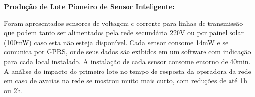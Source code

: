
\textbf{Produção de Lote Pioneiro de Sensor Inteligente:}

Foram apresentados sensores de voltagem e corrente para linhas de transmissão
que podem tanto ser alimentados pela rede secundária 220V ou por painel solar
(100mW) caso esta não esteja disponível. Cada sensor consome 14mW e se comunica
por GPRS, onde seus dados são exibidos em um software com indicação para cada
local instalado.
A instalação de cada sensor consome entorno de 40min. A análise do impacto do
primeiro lote no tempo de resposta da operadora da rede em caso de avarias na
rede se mostrou muito mais curto, com reduções de até 1h ou 2h.
